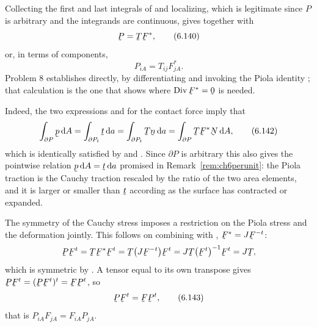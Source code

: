 Collecting the first and last integrals of  and localizing,
which is legitimate since $P$ is arbitrary and the integrands are
continuous, gives  together with
\begin{equation}
   \bP=\bT\bF^{*},
   \tag{6.140}\label{eq:6.140}
\end{equation}
or, in terms of components,
\begin{equation}
   P_{iA}=T_{ij}F^{*}_{jA}.
   \tag{6.141}\label{eq:6.141}
\end{equation}
Problem 8 establishes  directly, by differentiating
 and invoking the Piola identity ; that
calculation is the one that shows where $\Dvg\bF^{*}=\bze$ is needed.


Indeed, the two expressions  and  for the contact
force imply that
\begin{equation}
   \int_{\partial P}\bp\,\dl A=\int_{\partial P_{t}}\bt\,\dl a
   =\int_{\partial P_{t}}\bT\bn\,\dl a
   =\int_{\partial P}\bT\bF^{*}\bN\,\dl A ,
   \tag{6.142}\label{eq:6.142}
\end{equation}
which is identically satisfied by  and . Since
$\partial P$ is arbitrary this also gives the pointwise relation
$\bp\,\dl A=\bt\,\dl a$ promised in Remark~\ref{rem:ch6perunit}: the
Piola traction is the Cauchy traction rescaled by the ratio of the two
area elements, and it is larger or smaller than $\bt$ according as the
surface has contracted or expanded.


The symmetry of the Cauchy stress imposes a restriction on the Piola
stress and the deformation jointly. This follows on combining
 with , $\bF^{*}=J\bF^{-t}$:
\[
   \bP\bF^{t}=\bT\bF^{*}\bF^{t}=\bT\big(J\bF^{-t}\big)\bF^{t}
   =J\bT\big(\bF^{t}\big)^{-1}\bF^{t}=J\bT ,
\]
which is symmetric by . A tensor equal to its own transpose
gives $\bP\bF^{t}=(\bP\bF^{t})^{t}=\bF\bP^{t}$, so
\begin{equation}
   \bP\bF^{t}=\bF\bP^{t},
   \tag{6.143}\label{eq:6.143}
\end{equation}
that is $P_{iA}F_{jA}=F_{iA}P_{jA}$.


